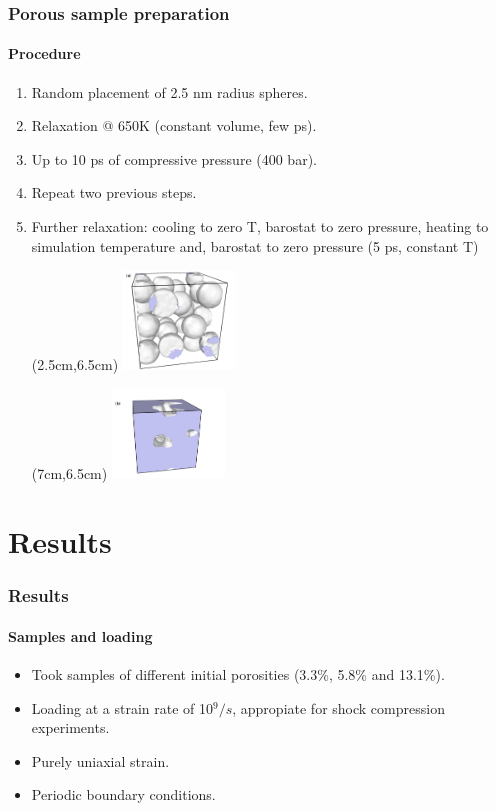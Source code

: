 \documentclass[12pt,t]{beamer}
\begin{document}
\begin{frame}
    \frametitle{Porous sample preparation}
    \framesubtitle{Procedure}
    \vspace{0cm}
    \begin{enumerate}
        \item Random placement of 2.5 nm radius spheres.
        \item Relaxation @ 650K (constant volume, few ps). 
        \item Up to 10 ps of compressive pressure (400 bar).
        \item Repeat two previous steps.
        \item Further relaxation: cooling to zero T, barostat to zero pressure, heating to simulation temperature and, barostat to zero pressure (5 ps, constant T)
        \begin{textblock*}{3cm}(2.5cm,6.5cm) %
            \includegraphics[width=3cm]{Presentacion_PANACM_Franco/spheres2.png}
        \end{textblock*}
        \begin{textblock*}{3cm}(7cm,6.5cm) %
            \includegraphics[width=3cm]{Presentacion_PANACM_Franco/spheres3.png}
        \end{textblock*}
    \end{enumerate}
\end{frame}


\section{Results}

\begin{frame}
    \frametitle{Results}
    \framesubtitle{Samples and loading}
    \vspace{1cm}
    \begin{itemize}
        \item Took samples of different initial porosities (3.3\%, 5.8\% and 13.1\%).
        \item Loading at a strain rate of 10$^9/s$, appropiate for shock compression experiments.
        \item Purely uniaxial strain.
        \item Periodic boundary conditions.
    \end{itemize}
\end{frame}
\end{document}
